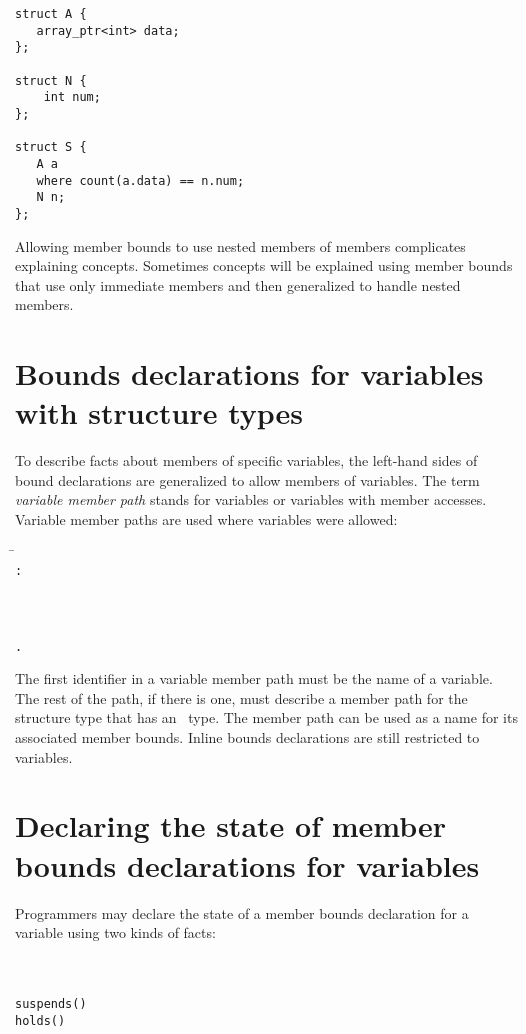 \begin{lstlisting}
struct A {
   array_ptr<int> data;
};

struct N {
    int num;
};

struct S {
   A a
   where count(a.data) == n.num;
   N n;
};
\end{lstlisting}

Allowing member bounds to use nested members of members complicates
explaining concepts. Sometimes concepts will be explained using member
bounds that use only immediate members and then generalized to handle
nested members.

\section{Bounds declarations for variables with structure types}

To describe facts about members of specific variables, the left-hand
sides of bound declarations are generalized to allow members of
variables. The term \emph{variable member path} stands for variables or
variables with member accesses. Variable member paths are used where
variables were allowed:
\begin{tabbing}
\=\\
\>  \texttt{:}  \\
\\
 \\
\>  \\
\>  \texttt{.} 
\end{tabbing}

The first identifier in a variable member path must be the name of a
variable. The rest of the path, if there is one, must
describe a member path for the structure type that has an
\arrayptr\ type. The member path can be used as a name for its
associated member bounds. Inline bounds declarations are still
restricted to variables.

\section{Declaring the state of member bounds declarations for variables}

Programmers may declare the state of a member bounds declaration
for a variable using two kinds of facts:
\begin{tabbing}
\= \\
\> \var{\ldots{}} \\
\> \texttt{suspends()} \\
\> \texttt{holds()}
\end{tabbing}

